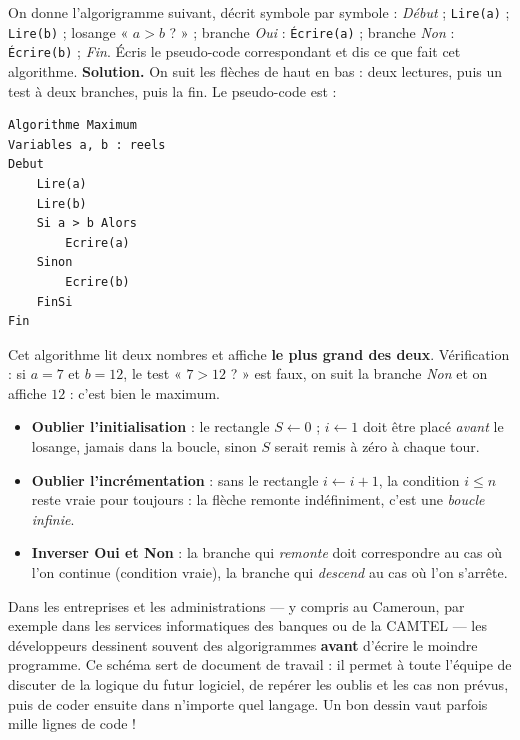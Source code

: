 \documentclass[11pt]{article}
\begin{document}
\begin{exoresolu}
On donne l'algorigramme suivant, décrit symbole par symbole : \emph{Début} ; \texttt{Lire(a)} ; \texttt{Lire(b)} ; losange « $a > b$ ? » ; branche \emph{Oui} : \texttt{Écrire(a)} ; branche \emph{Non} : \texttt{Écrire(b)} ; \emph{Fin}. Écris le pseudo-code correspondant et dis ce que fait cet algorithme.
\tcblower
\textbf{Solution.} On suit les flèches de haut en bas : deux lectures, puis un test à deux branches, puis la fin. Le pseudo-code est :
\begin{lstlisting}
Algorithme Maximum
Variables a, b : reels
Debut
    Lire(a)
    Lire(b)
    Si a > b Alors
        Ecrire(a)
    Sinon
        Ecrire(b)
    FinSi
Fin
\end{lstlisting}
Cet algorithme lit deux nombres et affiche \textbf{le plus grand des deux}. Vérification : si $a = 7$ et $b = 12$, le test « $7 > 12$ ? » est faux, on suit la branche \emph{Non} et on affiche $12$ : c'est bien le maximum.
\end{exoresolu}

\begin{attention}
\begin{itemize}
  \item \textbf{Oublier l'initialisation} : le rectangle $S \leftarrow 0$ ; $i \leftarrow 1$ doit être placé \emph{avant} le losange, jamais dans la boucle, sinon $S$ serait remis à zéro à chaque tour.
  \item \textbf{Oublier l'incrémentation} : sans le rectangle $i \leftarrow i + 1$, la condition $i \leq n$ reste vraie pour toujours : la flèche remonte indéfiniment, c'est une \emph{boucle infinie}.
  \item \textbf{Inverser Oui et Non} : la branche qui \emph{remonte} doit correspondre au cas où l'on continue (condition vraie), la branche qui \emph{descend} au cas où l'on s'arrête.
\end{itemize}
\end{attention}

\begin{savaistu}
Dans les entreprises et les administrations — y compris au Cameroun, par exemple dans les services informatiques des banques ou de la CAMTEL — les développeurs dessinent souvent des algorigrammes \textbf{avant} d'écrire le moindre programme. Ce schéma sert de document de travail : il permet à toute l'équipe de discuter de la logique du futur logiciel, de repérer les oublis et les cas non prévus, puis de coder ensuite dans n'importe quel langage. Un bon dessin vaut parfois mille lignes de code !
\end{savaistu}
\end{document}
